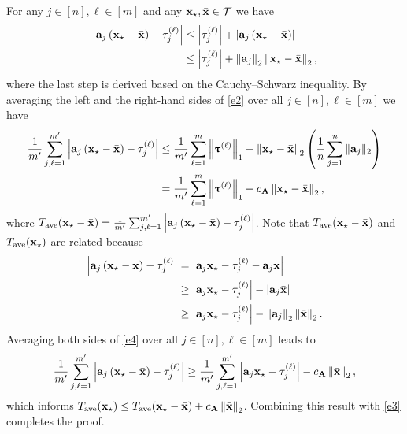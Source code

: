 \documentclass[12pt,draftcls,onecolumn]{IEEEtran}
\begin{document}
\begin{IEEEproof}
For any $j\in[n],\ell\in[m]$ and any $\mathbf{x}_{\star},\bar{\mathbf{x}}\in\mathcal{T}$ we have
\begin{equation}
\begin{aligned}
\label{e2}
\left|\mba_j\left(\mbx_{\star}-\bar{\mbx}\right)-\tau_j^{(\ell)}\right|&\leq\left|\tau_j^{(\ell)}\right|+\left|\mba_j\left(\mbx_{\star}-\bar{\mbx}\right)\right|\\&\leq\left|\tau_j^{(\ell)}\right|+\left\|\mba_j\right\|_2\left\|\mbx_{\star}-\bar{\mbx}\right\|_2,
\end{aligned}
\end{equation}
where the last step is derived based on the Cauchy–Schwarz inequality. By averaging the left and the right-hand sides of \eqref{e2} over all $j\in[n],\ell\in[m]$ we have
\begin{equation}
\begin{aligned}
\label{e3}
\frac{1}{m^{\prime}}\sum_{j,\ell=1}^{m^{\prime}}\left|\mba_j\left(\mbx_{\star}-\bar{\mbx}\right)-\tau_j^{(\ell)}\right|&\leq\frac{1}{m^{\prime}}\sum_{\ell=1}^{m}\left\|\boldsymbol{\uptau}^{(\ell)}\right\|_1+\left\|\mbx_{\star}-\bar{\mbx}\right\|_2\left(\frac{1}{n}\sum_{j=1}^{n}\|\mba_j\|_2\right)\\&=\frac{1}{m^{\prime}}\sum_{\ell=1}^{m}\left\|\boldsymbol{\uptau}^{(\ell)}\right\|_1+c_{\mbA}\left\|\mbx_{\star}-\bar{\mbx}\right\|_2,
\end{aligned}
\end{equation}
where $T_{\mathrm{ave}}(\mathbf{x}_{\star}-\bar{\mathbf{x}})=\frac{1}{m^{\prime}}\sum_{j,\ell=1}^{m^{\prime}}\left|\mathbf{a}_j\left(\mathbf{x}_{\star}-\bar{\mathbf{x}}\right)-\tau_j^{(\ell)}\right|$. Note that $T_{\mathrm{ave}}(\mathbf{x}_{\star}-\bar{\mathbf{x}})$ and $T_{\mathrm{ave}}(\mathbf{x}_{\star})$ are related because
\begin{equation}
\begin{aligned}
\label{e4}
\left|\mba_j\left(\mbx_{\star}-\bar{\mbx}\right)-\tau_j^{(\ell)}\right|&=\left|\mba_j\mbx_{\star}-\tau_j^{(\ell)}-\mba_j\bar{\mbx}\right|\\&\geq\left|\mba_j\mbx_{\star}-\tau_j^{(\ell)}\right|-\left|\mba_j\bar{\mbx}\right|\\&\geq\left|\mba_j\mbx_{\star}-\tau_j^{(\ell)}\right|-\left\|\mba_j\right\|_2\left\|\bar{\mbx}\right\|_2.
\end{aligned}
\end{equation}
Averaging both sides of \eqref{e4} over all $j\in[n],\ell\in[m]$ leads to
\begin{equation}
\label{e5}
\frac{1}{m^{\prime}}\sum_{j,\ell=1}^{m^{\prime}}\left|\mba_j\left(\mbx_{\star}-\bar{\mbx}\right)-\tau_j^{(\ell)}\right|\geq\frac{1}{m^{\prime}}\sum_{j,\ell=1}^{m^{\prime}}\left|\mba_j\mbx_{\star}-\tau_j^{(\ell)}\right|-c_{\mbA}\left\|\bar{\mbx}\right\|_2,
\end{equation}
which informs $T_{\mathrm{ave}}(\mathbf{x}_{\star})\leq T_{\mathrm{ave}}(\mathbf{x}_{\star}-\bar{\mathbf{x}})+c_{\mathbf{A}}\left\|\bar{\mathbf{x}}\right\|_2$. Combining this result with \eqref{e3} completes the proof.
\end{IEEEproof}
\end{document}
